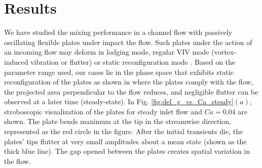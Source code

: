 \documentclass[%
aip,
amsmath,amssymb,
reprint,
]{revtex4-1}
\begin{document}
		
		\section{Results}
		We have studied the mixing performance in a channel flow with passively oscillating flexible plates under impact the flow. Such plates under the action of an incoming flow may deform in lodging mode, regular VIV mode (vortex-induced vibration or flutter) or static reconfiguration mode \cite{Zhang2020}. Based on the parameter range used, our cases lie in the phase space that exhibits static reconfiguration of the plates as shown in \cite{Zhang2020} where the plates comply with the flow, the projected area perpendicular to the flow reduces, and negligible flutter can be observed at a later time (steady-state). In Fig. \ref{fig:del_g_vs_Ca_steady}$(a)$, stroboscopic visualization of the plates for steady inlet flow and $Ca=0.04$ are shown. The plate bends maximum at the tip in the streamwise direction, represented as the red circle in the figure. After the initial transients die, the plates' tips flutter at very small amplitudes about a mean state (shown as the thick blue line). The gap opened between the plates creates spatial variation in the flow. 
		
\end{document}
